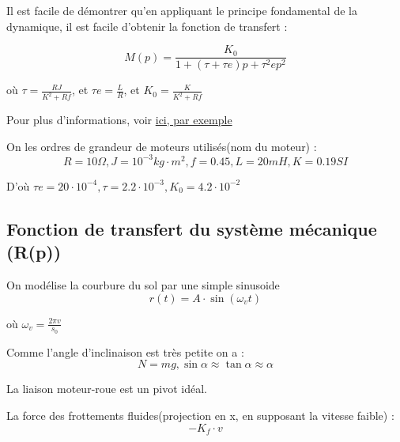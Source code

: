 \documentclass[11pt]{article} %
\begin{document}
Il est facile de démontrer qu'en appliquant le principe fondamental de la dynamique, il est facile d'obtenir la fonction de transfert :


\begin{equation} M(p) = \frac{K_0}{1 + (\tau + \tau e)p + \tau^2 ep^2} \end{equation} 

où \begin{math}  \tau = \frac{RJ}{K^2 + Rf} \end{math}, et \begin{math} \tau e = \frac{L}{R}\end{math}, et \begin{math} K_0 = \frac{K}{K^2 + Rf} \end{math}

Pour plus d'informations, voir \href{http://physiquenetappliquee.free.fr/Modele_dyna_MCC.php}{ici, par exemple}

On les ordres de grandeur de moteurs utilisés(nom du moteur) : 
\begin{equation} R=10\Omega ,  J=10^{-3} kg  \cdot m^2 , f=0.45 , L =20mH , K=0.19SI \end{equation}

D'où \begin{math} \tau e = 20 \cdot 10^{-4} , \tau = 2.2 \cdot 10^{-3} , K_0 = 4.2 \cdot 10^{-2} \end{math}

\subsection{Fonction de transfert du système mécanique (R(p))}

On modélise la courbure du sol par une simple sinusoide \begin{equation}  r(t) = A \cdot \sin (\omega_v t) \end{equation}

où \begin{math} \omega_v = \frac{2\pi v}{s_0}\end{math}

Comme l'angle d'inclinaison est très petite on a : \begin{equation} N = mg , \sin \alpha \approx \tan \alpha \approx \alpha\end{equation} 

La liaison moteur-roue est un pivot idéal.

La force des frottements fluides(projection en x, en supposant la vitesse faible) : \begin{equation} -K_f \cdot v \end{equation}
\end{document}
